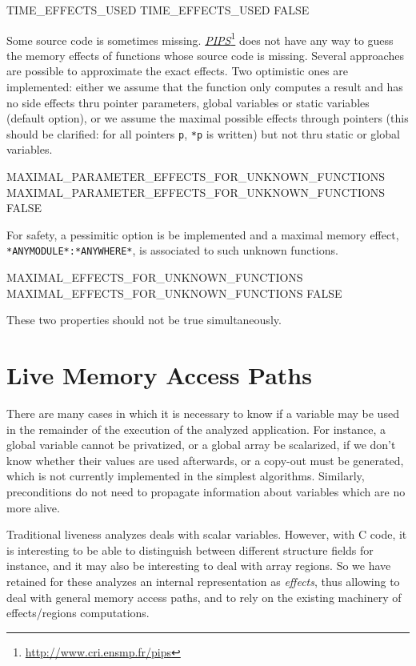 \documentclass[a4paper]{report}
\newcommand{\LINK}[2]{\href{#2}{#1}\footnote{\url{#2}}\xspace}
\newcommand{\PIPS}{\LINK{\emph{PIPS}}{http://www.cri.ensmp.fr/pips}}
\begin{document}
\begin{PipsProp}{TIME_EFFECTS_USED}
TIME_EFFECTS_USED FALSE
\end{PipsProp}

Some source code is sometimes missing. \PIPS does not have any way to
guess the memory effects of functions whose source code is
missing. Several approaches are possible to approximate the exact
effects. Two optimistic ones are implemented: either we assume that
the function only computes a result and has no side effects thru
pointer parameters, global variables or static variables (default
option), or we assume the maximal possible effects through pointers
(this should be clarified: for all pointers \verb/p/, \verb/*p/ is
written) but not thru static or global variables.

\begin{PipsProp}{MAXIMAL_PARAMETER_EFFECTS_FOR_UNKNOWN_FUNCTIONS}
MAXIMAL_PARAMETER_EFFECTS_FOR_UNKNOWN_FUNCTIONS FALSE
\end{PipsProp}

For safety, a pessimitic option is be implemented and a maximal memory
effect, \verb/*ANYMODULE*:*ANYWHERE*/, is associated to such unknown
functions.

\begin{PipsProp}{MAXIMAL_EFFECTS_FOR_UNKNOWN_FUNCTIONS}
MAXIMAL_EFFECTS_FOR_UNKNOWN_FUNCTIONS FALSE
\end{PipsProp}

These two properties should not be true simultaneously.

\section{Live Memory Access Paths}
\label{subsection-live-memory-paths}

There are many cases in which it is necessary to know if a variable
may be used in the remainder of the execution of the analyzed
application. For instance, a global variable cannot be privatized, or
a global array be scalarized, if we don't know whether their values
are used afterwards, or a copy-out must be generated, which is not
currently implemented in the simplest algorithms. Similarly,
preconditions do not need to propagate information about variables
which are no more alive.

Traditional liveness analyzes deals with scalar variables. However,
with C code, it is interesting to be able to distinguish between
different structure fields for instance, and it may also be
interesting to deal with array regions. So we have retained for these
analyzes an internal representation as \emph{effects}, thus allowing
to deal with general memory access paths, and to rely on the existing
machinery of effects/regions computations.
\end{document}

